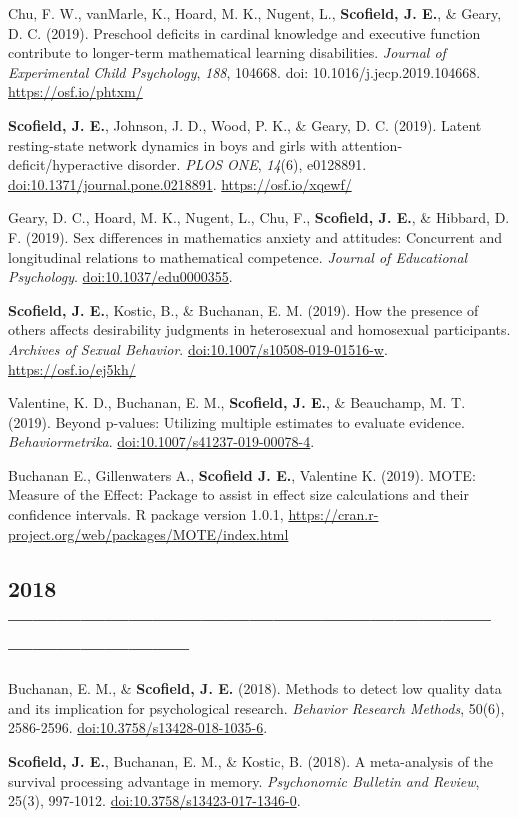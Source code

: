 \documentclass[11pt, a4paper]{awesome-cv}
\begin{document}
Chu, F. W., vanMarle, K., Hoard, M. K., Nugent, L., \textbf{Scofield, J. E.}, \& Geary, D. C. (2019). Preschool deficits in cardinal knowledge and executive function contribute to longer-term mathematical learning disabilities. \emph{Journal of Experimental Child Psychology}, \emph{188}, 104668. doi: 10.1016/j.jecp.2019.104668. \url{https://osf.io/phtxm/}

\textbf{Scofield, J. E.}, Johnson, J. D., Wood, P. K., \& Geary, D. C. (2019). Latent resting-state network dynamics in boys and girls with attention-deficit/hyperactive disorder. \emph{PLOS ONE}, \emph{14}(6), e0128891. \url{doi:10.1371/journal.pone.0218891}. \url{https://osf.io/xqewf/}

Geary, D. C., Hoard, M. K., Nugent, L., Chu, F., \textbf{Scofield, J. E.}, \& Hibbard, D. F. (2019). Sex differences in mathematics anxiety and attitudes: Concurrent and longitudinal relations to mathematical competence. \emph{Journal of Educational Psychology}. \url{doi:10.1037/edu0000355}.

\textbf{Scofield, J. E.}, Kostic, B., \& Buchanan, E. M. (2019). How the presence of others affects desirability judgments in heterosexual and homosexual participants. \emph{Archives of Sexual Behavior}. \url{doi:10.1007/s10508-019-01516-w}. \url{https://osf.io/ej5kh/}

Valentine, K. D., Buchanan, E. M., \textbf{Scofield, J. E.}, \& Beauchamp, M. T. (2019). Beyond p-values: Utilizing multiple estimates to evaluate evidence. \emph{Behaviormetrika}. \url{doi:10.1007/s41237-019-00078-4}.

Buchanan E., Gillenwaters A., \textbf{Scofield J. E.}, Valentine K. (2019). MOTE: Measure of the Effect: Package
to assist in effect size calculations and their confidence intervals. R package version 1.0.1, \url{https://cran.r-project.org/web/packages/MOTE/index.html}

\hypertarget{section-2}{%
\subsection{2018 -----------------------------------------------------------------------------------}\label{section-2}}

Buchanan, E. M., \& \textbf{Scofield, J. E.} (2018). Methods to detect low quality data and its implication for psychological research. \emph{Behavior Research Methods}, 50(6), 2586-2596. \url{doi:10.3758/s13428-018-1035-6}.

\textbf{Scofield, J. E.}, Buchanan, E. M., \& Kostic, B. (2018). A meta-analysis of the survival processing advantage in memory. \emph{Psychonomic Bulletin and Review}, 25(3), 997-1012. \url{doi:10.3758/s13423-017-1346-0}.
\end{document}
